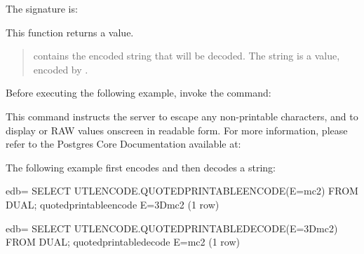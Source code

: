 \documentclass[letterpaper,10pt,english,openany,oneside]{sphinxmanual}
\begin{document}
The signature is:
\begin{quote}

\end{quote}

This function returns a  value.


\begin{quote}

 contains the encoded string that will be decoded. The string is
a  value, encoded by .
\end{quote}


Before executing the following example, invoke the command:
\begin{quote}

\end{quote}

This command instructs the server to escape any non-printable
characters, and to display  or RAW values onscreen in readable
form. For more information, please refer to the Postgres Core
Documentation available at:


The following example first encodes and then decodes a string:

%
\begin{sphinxVerbatim}[commandchars=\\\{\}]
edb=\PYGZsh{} SELECT UTL\PYGZus{}ENCODE.QUOTED\PYGZus{}PRINTABLE\PYGZus{}ENCODE(\PYGZsq{}E=mc2\PYGZsq{}) FROM DUAL;  quoted\PYGZus{}printable\PYGZus{}encode
\PYGZhy{}\PYGZhy{}\PYGZhy{}\PYGZhy{}\PYGZhy{}\PYGZhy{}\PYGZhy{}\PYGZhy{}\PYGZhy{}\PYGZhy{}\PYGZhy{}\PYGZhy{}\PYGZhy{}\PYGZhy{}\PYGZhy{}\PYGZhy{}\PYGZhy{}\PYGZhy{}\PYGZhy{}\PYGZhy{}\PYGZhy{}\PYGZhy{}\PYGZhy{}\PYGZhy{}\PYGZhy{}
 E=3Dmc2
(1 row)

edb=\PYGZsh{} SELECT UTL\PYGZus{}ENCODE.QUOTED\PYGZus{}PRINTABLE\PYGZus{}DECODE(\PYGZsq{}E=3Dmc2\PYGZsq{}) FROM DUAL;
 quoted\PYGZus{}printable\PYGZus{}decode
\PYGZhy{}\PYGZhy{}\PYGZhy{}\PYGZhy{}\PYGZhy{}\PYGZhy{}\PYGZhy{}\PYGZhy{}\PYGZhy{}\PYGZhy{}\PYGZhy{}\PYGZhy{}\PYGZhy{}\PYGZhy{}\PYGZhy{}\PYGZhy{}\PYGZhy{}\PYGZhy{}\PYGZhy{}\PYGZhy{}\PYGZhy{}\PYGZhy{}\PYGZhy{}\PYGZhy{}\PYGZhy{}
 E=mc2
(1 row)
\end{sphinxVerbatim}
\end{document}
